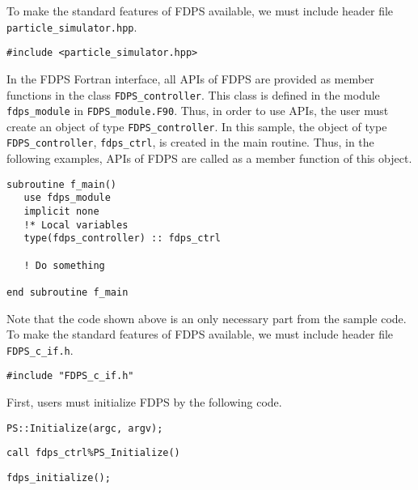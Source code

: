 \ifCpp %
To make the standard features of FDPS available, we must include header file  \texttt{particle\_simulator.hpp}.
\begin{lstlisting}[caption=Including header file \texttt{particle\_simulator.hpp}]
#include <particle_simulator.hpp>
\end{lstlisting}
\endifCpp
\ifFtn %
In the FDPS Fortran interface, all APIs of FDPS are provided as member functions in the class \texttt{FDPS\_controller}. This class is defined in the module \texttt{fdps\_module} in \texttt{FDPS\_module.F90}. Thus, in order to use APIs, the user must create an object of type \texttt{FDPS\_controller}. In this sample, the object of type \texttt{FDPS\_controller},  \texttt{fdps\_ctrl}, is created in the main routine. Thus, in the following examples, APIs of FDPS are called as a member function of this object.

\begin{lstlisting}[caption=Creation of an object of type \texttt{fdps\_controller}]
subroutine f_main()
   use fdps_module
   implicit none
   !* Local variables
   type(fdps_controller) :: fdps_ctrl
    
   ! Do something
   
end subroutine f_main    
\end{lstlisting}

Note that the code shown above is an only necessary part from the sample code. 
\endifFtn
\ifC %
To make the standard features of FDPS available, we must include header file  \texttt{FDPS\_c\_if.h}.
\begin{lstlisting}[caption=Including header file \texttt{FDPS\_c\_if.h}]
#include "FDPS_c_if.h"
\end{lstlisting}
\endifC


First, users must initialize FDPS by the following code.
\ifCpp %
\begin{lstlisting}[caption=Initialization of FDPS]
PS::Initialize(argc, argv);
\end{lstlisting}
\endifCpp
\ifFtn %
\begin{lstlisting}[caption=Initialization of FDPS]
call fdps_ctrl%PS_Initialize()
\end{lstlisting}
\endifFtn
\ifC %
\begin{lstlisting}[caption=Initialization of FDPS]
fdps_initialize();
\end{lstlisting}
\endifC


